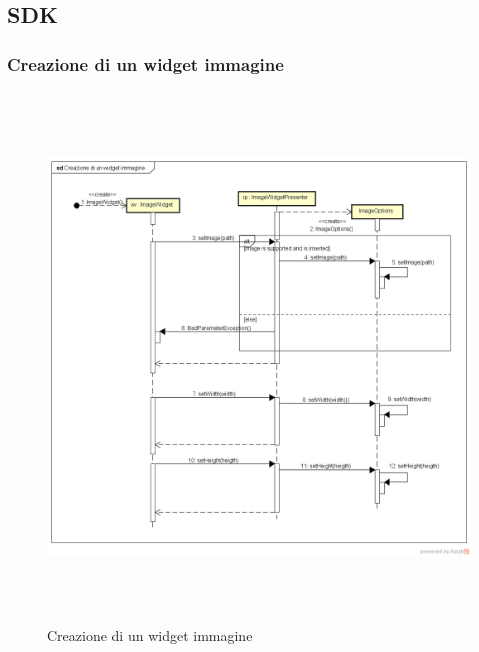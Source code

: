 \subsection{SDK}

\subsubsection{Creazione di un widget immagine}

\label{Creazione di un widget immagine}
\begin{figure}[ht]
	\centering
	\includegraphics[width=16cm, height=14cm]{Sezioni/Diagrammi/img/Creazione di un widget immagine.png}
	\caption{Creazione di un widget immagine}
\end{figure}

